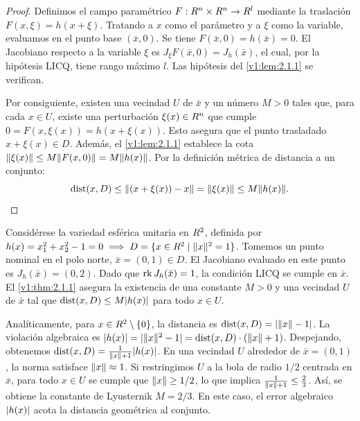 \begin{proof}
 Definimos el campo paramétrico $F : R^n \times R^n \to R^l$ mediante la traslación $F(x, \xi) = h(x + \xi)$. Tratando a $x$ como el parámetro y a $\xi$ como la variable, evaluamos en el punto base $(\bar{x}, 0)$. Se tiene $F(\bar{x}, 0) = h(\bar{x}) = 0$. El Jacobiano respecto a la variable $\xi$ es $J_\xi F(\bar{x}, 0) = J_h(\bar{x})$, el cual, por la hipótesis LICQ, tiene rango máximo $l$. Las hipótesis del \cref{v1:lem:2.1.1} se verifican.
 
 Por consiguiente, existen una vecindad $U$ de $\bar{x}$ y un número $M > 0$ tales que, para cada $x \in U$, existe una perturbación $\xi(x) \in R^n$ que cumple $0 = F(x, \xi(x)) = h(x + \xi(x))$. Esto asegura que el punto trasladado $x + \xi(x) \in D$. Además, el \cref{v1:lem:2.1.1} establece la cota $\lVert\xi(x)\rVert \le M \lVert F(x, 0)\rVert = M \lVert h(x)\rVert$.
 Por la definición métrica de distancia a un conjunto:
 \[
 \operatorname{dist}(x, D) \le \lVert(x + \xi(x)) - x\rVert = \lVert\xi(x)\rVert \le M \lVert h(x)\rVert.
 \]
\end{proof}

\begin{example}\label{v1:exa:2.1.2}
 Considérese la variedad esférica unitaria en $R^2$, definida por $h(x) = x_1^2 + x_2^2 - 1 = 0 \implies D = \{ x \in R^2 \mid \lVert x\rVert^2 = 1 \}$.
 Tomemos un punto nominal en el polo norte, $\bar{x} = (0,1) \in D$. El Jacobiano evaluado en este punto es $J_h(\bar{x}) = (0, 2)$. Dado que $\operatorname{rk} J_h(\bar{x}) = 1$, la condición LICQ se cumple en $\bar{x}$. El \cref{v1:thm:2.1.1} asegura la existencia de una constante $M > 0$ y una vecindad $U$ de $\bar{x}$ tal que $\operatorname{dist}(x, D) \le M \lvert h(x)\rvert$ para todo $x \in U$.
 
 Analíticamente, para $x \in R^2 \setminus \{0\}$, la distancia es $\operatorname{dist}(x, D) = \lvert\lVert x\rVert - 1\rvert$. La violación algebraica es $\lvert h(x)\rvert = \lvert\lVert x\rVert^2 - 1\rvert = \operatorname{dist}(x, D) \cdot (\lVert x\rVert + 1)$. Despejando, obtenemos $\operatorname{dist}(x, D) = \frac{1}{\lVert x\rVert + 1} \lvert h(x)\rvert$. En una vecindad $U$ alrededor de $\bar{x} = (0,1)$, la norma satisface $\lVert x\rVert \approx 1$. Si restringimos $U$ a la bola de radio $1/2$ centrada en $\bar{x}$, para todo $x \in U$ se cumple que $\lVert x\rVert \ge 1/2$, lo que implica $\frac{1}{\lVert x\rVert + 1} \le \frac{2}{3}$.
 Así, se obtiene la constante de Lyusternik $M = 2/3$. En este caso, el error algebraico $\lvert h(x)\rvert$ acota la distancia geométrica al conjunto.
\end{example}

